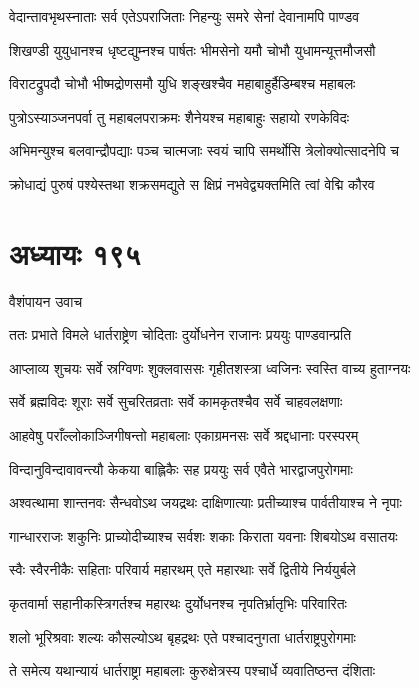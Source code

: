 \twolineshloka
{वेदान्तावभृथस्नाताः सर्व एतेऽपराजिताः}
{निहन्युः समरे सेनां देवानामपि पाण्डव}


\twolineshloka
{शिखण्डी युयुधानश्च धृष्टद्युम्नश्च पार्षतः}
{भीमसेनो यमौ चोभौ युधामन्यूत्तमौजसौ}


\twolineshloka
{विराटद्रुपदौ चोभौ भीष्मद्रोणसमौ युधि}
{शङ्खश्चैव महाबाहुर्हैडिम्बश्च महाबलः}


\twolineshloka
{पुत्रोऽस्याञ्जनपर्वा तु महाबलपराक्रमः}
{शैनेयश्च महाबाहुः सहायो रणकेविदः}


\twolineshloka
{अभिमन्युश्च बलवान्द्रौपद्याः पञ्च चात्मजाः}
{स्वयं चापि समर्थोसि त्रेलोक्योत्सादनेपि च}


\twolineshloka
{क्रोधाद्यं पुरुषं पश्येस्तथा शक्रसमद्युते}
{स क्षिप्रं नभवेद्व्यक्तमिति त्वां वेद्मि कौरव}


\chapter{अध्यायः १९५}
\twolineshloka
{वैशंपायन उवाच}
{}


\twolineshloka
{ततः प्रभाते विमले धार्तराष्ट्रेण चोदिताः}
{दुर्योधनेन राजानः प्रययुः पाण्डवान्प्रति}


\threelineshloka
{आप्लाव्य शुचयः सर्वे स्रग्विणः शुक्लवाससः}
{गृहीतशस्त्रा ध्वजिनः स्वस्ति वाच्य हुताग्नयः}
{}


\twolineshloka
{सर्वे ब्रह्मविदः शूराः सर्वे सुचरितव्रताः}
{सर्वे कामकृतश्चैव सर्वे चाहवलक्षणाः}


\twolineshloka
{आहवेषु पराँल्लोकाञ्जिगीषन्तो महाबलाः}
{एकाग्रमनसः सर्वे श्रद्दधानाः परस्परम्}


\twolineshloka
{विन्दानुविन्दावावन्त्यौ केकया बाह्लिकैः सह}
{प्रययुः सर्व एवैते भारद्वाजपुरोगमाः}


\twolineshloka
{अश्वत्थामा शान्तनवः सैन्धवोऽथ जयद्रथः}
{दाक्षिणात्याः प्रतीच्याश्च पार्वतीयाश्च ने नृपाः}


\twolineshloka
{गान्धारराजः शकुनिः प्राच्योदीच्याश्च सर्वशः}
{शकाः किराता यवनाः शिबयोऽथ वसातयः}


\twolineshloka
{स्वैः स्वैरनीकैः सहिताः परिवार्य महारथम्}
{एते महारथाः सर्वे द्वितीये निर्ययुर्बले}


\twolineshloka
{कृतवार्मा सहानीकस्त्रिगर्तश्च महारथः}
{दुर्योधनश्च नृपतिर्भ्रातृभिः परिवारितः}


\twolineshloka
{शलो भूरिश्रवाः शल्यः कौसल्योऽथ बृहद्रथः}
{एते पश्चादनुगता धार्तराष्ट्रपुरोगमाः}


\twolineshloka
{ते समेत्य यथान्यायं धार्तराष्ट्रा महाबलाः}
{कुरुक्षेत्रस्य पश्चार्धे व्यवातिष्ठन्त दंशिताः}


